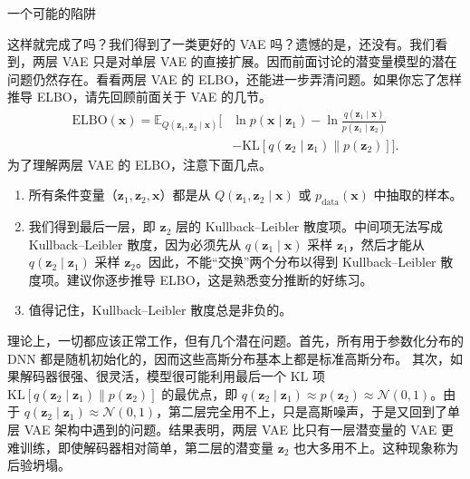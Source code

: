\medskip\noindent 一个可能的陷阱\par\smallskip
这样就完成了吗？我们得到了一类更好的 VAE 吗？遗憾的是，还没有。我们看到，两层 VAE 只是对单层 VAE 的直接扩展。因而前面讨论的潜变量模型的潜在问题仍然存在。看看两层 VAE 的 ELBO，还能进一步弄清问题。如果你忘了怎样推导 ELBO，请先回顾前面关于 VAE 的几节。
\begin{equation}
\begin{aligned}
\mathrm{ELBO}(\mathbf{x})=\mathbb{E}_{Q(\mathbf{z}_1,\mathbf{z}_2\mid\mathbf{x})}\Biggl[
 &\ln p(\mathbf{x}\mid\mathbf{z}_1)-\ln\frac{q(\mathbf{z}_1\mid\mathbf{x})}{p(\mathbf{z}_1\mid\mathbf{z}_2)}\\
 &-\mathrm{KL}[q(\mathbf{z}_2\mid\mathbf{z}_1)\|p(\mathbf{z}_2)]\Biggr].
\end{aligned}
\tag{5.82}\label{eq:05-82}
\end{equation}
为了理解两层 VAE 的 ELBO，注意下面几点。
\begin{enumerate}
\item 所有条件变量（$\mathbf{z}_1,\mathbf{z}_2,\mathbf{x}$）都是从 $Q(\mathbf{z}_1,\mathbf{z}_2\mid\mathbf{x})$ 或 $p_{\mathrm{data}}(\mathbf{x})$ 中抽取的样本。
\item 我们得到最后一层，即 $\mathbf{z}_2$ 层的 Kullback–Leibler 散度项。中间项无法写成 Kullback–Leibler 散度，因为必须先从 $q(\mathbf{z}_1\mid\mathbf{x})$ 采样 $\mathbf{z}_1$，然后才能从 $q(\mathbf{z}_2\mid\mathbf{z}_1)$ 采样 $\mathbf{z}_2$。因此，不能“交换”两个分布以得到 Kullback–Leibler 散度项。建议你逐步推导 ELBO，这是熟悉变分推断的好练习。
\item 值得记住，Kullback–Leibler 散度总是非负的。
\end{enumerate}
理论上，一切都应该正常工作，但有几个潜在问题。首先，所有用于参数化分布的 DNN 都是随机初始化的，因而这些高斯分布基本上都是标准高斯分布。
其次，如果解码器很强、很灵活，模型很可能利用最后一个 KL 项 $\mathrm{KL}[q(\mathbf{z}_2\mid\mathbf{z}_1)\|p(\mathbf{z}_2)]$ 的最优点，即 $q(\mathbf{z}_2\mid\mathbf{z}_1)\approx p(\mathbf{z}_2)\approx\mathcal{N}(0,1)$。由于 $q(\mathbf{z}_2\mid\mathbf{z}_1)\approx\mathcal{N}(0,1)$，第二层完全用不上，只是高斯噪声，于是又回到了单层 VAE 架构中遇到的问题。结果表明，两层 VAE 比只有一层潜变量的 VAE 更难训练，即使解码器相对简单，第二层的潜变量 $\mathbf{z}_2$ 也大多用不上。这种现象称为后验坍塌。


